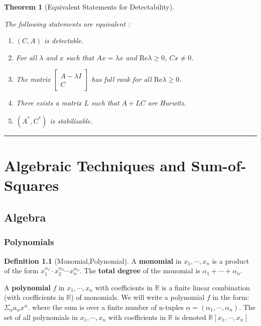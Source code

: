 \documentclass[
]{book}
\newtheorem{theorem}{Theorem}[chapter]
\theoremstyle{definition}
\newtheorem{definition}{Definition}[chapter]
\theoremstyle{definition}
\theoremstyle{definition}
\theoremstyle{definition}
\theoremstyle{remark}
\begin{document}
\begin{theorem}[Equivalent Statements for Detectability]
\protect\hypertarget{thm:ltidetectable}{}\label{thm:ltidetectable}

The following statements are equivalent \citep{zhou1996book-robust}:

\begin{enumerate}
\def\labelenumi{\arabic{enumi}.}
\item
  \((C,A)\) is detectable.
\item
  For all \(\lambda\) and \(x\) such that \(A x = \lambda x\) and \(\text{Re} \lambda \ge 0\), \(C x \ne 0\).
\item
  The matrix \(\begin{bmatrix} A - \lambda I \\ C \end{bmatrix}\) has full rank for all \(\text{Re} \lambda \ge 0\).
\item
  There exists a matrix \(L\) such that \(A+LC\) are Hurwitz.
\item
  \((A^*, C^*)\) is stabilizable.
\end{enumerate}

\end{theorem}

\begin{center}\rule{0.5\linewidth}{0.5pt}\end{center}

\hypertarget{algebraic-techniques-and-sum-of-squares}{%
\chapter{Algebraic Techniques and Sum-of-Squares}\label{algebraic-techniques-and-sum-of-squares}}

\hypertarget{algebra}{%
\section{Algebra}\label{algebra}}

\hypertarget{polynomials}{%
\subsection{Polynomials}\label{polynomials}}

\begin{definition}[Monomial,Polynomial]
\protect\hypertarget{def:monomial}{}\label{def:monomial}A \textbf{monomial} in \(x_1,\cdots,x_n\) is a product of the form \(x_1^{\alpha_1}\cdot x_2^{\alpha_2}\cdots x_n^{\alpha_n}\). The \textbf{total degree} of the monomial is \(\alpha_1+\cdots+\alpha_n\).

A \textbf{polynomial} \(f\) in \(x_1,\cdots,x_n\) with coefficients in \(\mathbb{R}\) is a finite linear combination (with coefficients in \(\mathbb{R}\)) of monomials. We will write a polynomial \(f\) in the form: \(\Sigma_\alpha a_\alpha x^\alpha\). where the sum is over a finite number of n-tuples \(\alpha = (\alpha_1,\cdots,\alpha_n)\). The set of all polynomials in \(x_1,\cdots,x_n\) with coefficients in \(\mathbb{R}\) is denoted \(\mathbb{R}[x_1,\cdots,x_n]\)
\end{definition}
\end{document}
